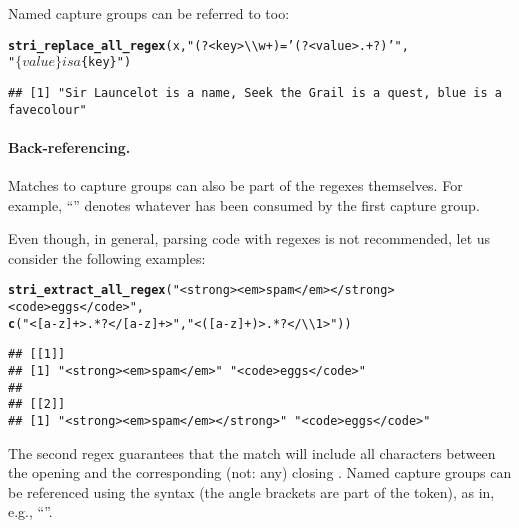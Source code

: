 \documentclass[nojss]{jss}\usepackage[]{graphicx}\usepackage[]{xcolor}
\makeatletter
\newcommand{\hlstr}[1]{\textcolor[rgb]{0.192,0.494,0.8}{#1}}%
\newcommand{\hlstd}[1]{\textcolor[rgb]{0.345,0.345,0.345}{#1}}%
\newcommand{\hlkwd}[1]{\textcolor[rgb]{0.737,0.353,0.396}{\textbf{#1}}}%
\newenvironment{kframe}{%
 \def\at@end@of@kframe{}%
 \ifinner\ifhmode%
  \def\at@end@of@kframe{\end{minipage}}%
  \begin{minipage}{\columnwidth}%
 \fi\fi%
 \def\FrameCommand##1{\hskip\@totalleftmargin \hskip-\fboxsep
 \colorbox{shadecolor}{##1}\hskip-\fboxsep
     \hskip-\linewidth \hskip-\@totalleftmargin \hskip\columnwidth}%
 \MakeFramed {\advance\hsize-\width
   \@totalleftmargin\z@ \linewidth\hsize
   \@setminipage}}%
 {\par\unskip\endMakeFramed%
 \at@end@of@kframe}
\newenvironment{knitrout}{}{} %
\makeatother
\begin{document}
Named capture groups can be referred to too:

\begin{knitrout}
\color{fgcolor}\begin{kframe}
\begin{alltt}
\hlkwd{stri_replace_all_regex}\hlstd{(x,} \hlstr{"(?<key>\textbackslash{}\textbackslash{}w+)='(?<value>.+?)'"}\hlstd{,}
  \hlstr{"$\{value\} is a $\{key\}"}\hlstd{)}
\end{alltt}
\begin{verbatim}
## [1] "Sir Launcelot is a name, Seek the Grail is a quest, blue is a favecolour"
\end{verbatim}
\end{kframe}
\end{knitrout}

\paragraph{Back-referencing.}
Matches to capture groups can also be part of the regexes themselves.
For example, ``'' denotes whatever
has been consumed by the first capture group.

Even though, in general, parsing  code with regexes is
not recommended, let us consider the following examples:

\begin{knitrout}
\color{fgcolor}\begin{kframe}
\begin{alltt}
\hlkwd{stri_extract_all_regex}\hlstd{(}\hlstr{"<strong><em>spam</em></strong><code>eggs</code>"}\hlstd{,}
  \hlkwd{c}\hlstd{(}\hlstr{"<[a-z]+>.*?</[a-z]+>"}\hlstd{,} \hlstr{"<([a-z]+)>.*?</\textbackslash{}\textbackslash{}1>"}\hlstd{))}
\end{alltt}
\begin{verbatim}
## [[1]]
## [1] "<strong><em>spam</em>" "<code>eggs</code>"    
## 
## [[2]]
## [1] "<strong><em>spam</em></strong>" "<code>eggs</code>"
\end{verbatim}
\end{kframe}
\end{knitrout}


The second regex guarantees that the match will include all characters
between the opening  and the corresponding (not: any)
closing .
Named capture groups can be referenced using the
 syntax
(the angle brackets are part of the token), as in, e.g.,
``''.
\end{document}
